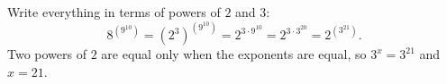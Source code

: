 Write everything in terms of powers of $2$ and $3$:
\[8^{\left(9^{10}\right)}=\left(2^3\right)^{\left(9^{10}\right)}=2^{3\cdot9^{10}}=2^{3\cdot3^{20}}=2^{\left(3^{21}\right)} .\]
Two powers of $2$ are equal only when the exponents are equal, so $3^x=3^{21}$ and $x=\boxed{21}$.
